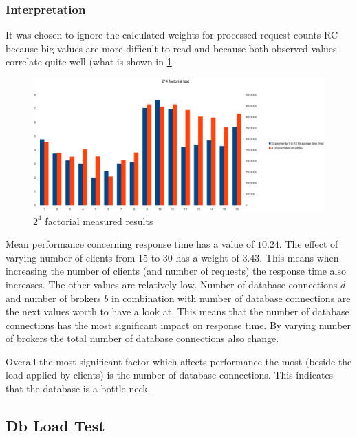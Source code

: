 \documentclass[milestone1.tex]{subfiles}
\begin{document}
\subsubsection{Interpretation}
It was chosen to ignore the calculated weights for processed request counts RC because big values are more difficult to read and because both observed values correlate quite well (what is shown in \ref{fig:2kmeasuredresults}.

\begin{figure}[H]
	\begin{center}
    \includegraphics[scale=0.3]{../drawings/2k-factorial-plot.eps}
  \end{center}
  \caption{$2^4$ factorial measured results}
  \label{fig:2kmeasuredresults}
\end{figure}



Mean performance concerning response time has a value of $10.24$. The effect of varying number of clients from 15 to 30 has a weight of $3.43$. This means when increasing the number of clients (and number of requests) the response time also increases. The other values are relatively low. Number of database connections $d$ and number of brokers $b$ in combination with number of database connections  are the next values worth to have a look at. This means that the number of database connections has the most significant impact on response time. By varying number of brokers the total number of database connections also change.

Overall the most significant factor which affects performance the most (beside the load applied by clients) is the number of database connections. This indicates that the database is a bottle neck.

\subsection{Db Load Test}
\end{document}

